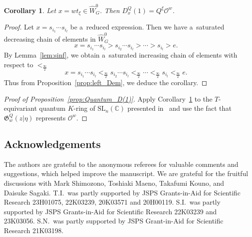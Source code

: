 \documentclass[pdftex]{sigma}
\numberwithin{equation}{section}
\newcommand{\C}{\mathbb{C}}
\newcommand{\Gro}[1]{\mathfrak{G}^Q_{#1}}
\renewcommand{\O}{\mathscr{O}}
\newcommand{\SL}{\mathrm{SL}}
\newcommand{\sinf}{\frac{\infty}{2}}
\newtheorem{Corollary}[Theorem]{Corollary}
\theoremstyle{definition}
\begin{document}
 \begin{Corollary} \label{cor:BF}
Let $x=wt_\xi\in \hat{W}_G^0$. Then
$
D_x^Q(1)
=Q^\xi \mathscr{O}^{w}$.
\end{Corollary}
\begin{proof}
Let $x=s_{i_1}\cdots s_{i_l}$ be a~reduced expression.
Then we have a~saturated decreasing chain of elements in
$\hat{W}_G^0$
\[
x=s_{i_1}\cdots s_{i_l}
>s_{i_2}\cdots s_{i_l}
>
\cdots
>s_{i_l}>e.
\]
By Lemma~\ref{lem:sinf}, we obtain a~saturated increasing chain of elements
with respect to $<_\sinf$
\[
x=s_{i_1}\cdots s_{i_l}
<_\sinf s_{i_2}\cdots s_{i_l}
<_\sinf
\cdots
<_\sinf s_{i_l}<_\sinf e.
\]
Thus from Proposition~\ref{prop:left_Dem}, we deduce the corollary.
\end{proof}
\begin{proof}[Proof of Proposition~\ref{prop:Quantum_D(1)}]
Apply Corollary~\ref{cor:BF} to the $T$-equivariant
quantum $K$-ring of \linebreak
$\SL_n(\C)$ presented in~\cite{MNS1} and use the fact that
$\Gro{w}(z|\eta)$ represents $\O^w$.
\end{proof}

\subsection*{Acknowledgements}The authors are grateful to the anonymous referees for valuable comments and suggestions, which helped improve the manuscript.
We are grateful for the fruitful discussions with Mark Shimozono, Toshiaki Maeno, Takafumi Kouno, and Daisuke Sagaki.
T.I.\ was partly supported by JSPS Grants-in-Aid for Scientific Research 23H01075, 22K03239, 20K03571 and 20H00119.
S.I.\ was partly supported by JSPS Grants-in-Aid for Scientific Research 22K03239 and 23K03056.
S.N.\ was partly supported by JSPS Grant-in-Aid for Scientific Research 21K03198.
\end{document}
